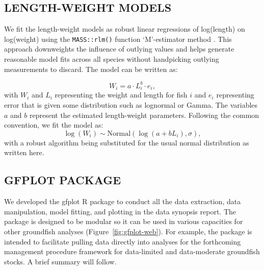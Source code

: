 \documentclass[11pt]{book}\usepackage[]{graphicx}\usepackage[]{color}
\begin{document}
\subsection{LENGTH-WEIGHT MODELS} \label{sec:length-weight-models}

We fit the length-weight models as robust linear regressions of log(length) on
log(weight) using the \texttt{MASS::rlm()} function `M'-estimator method
\citep{venables2002}. This approach downweights the influence of outlying values
and helps generate reasonable model fits across all species without handpicking
outlying measurements to discard. The model can be written as:

\begin{equation}
  W_i = a \cdot L_i^b \cdot e_i,
\end{equation}
with $W_i$ and $L_i$ representing the weight and length for fish $i$ and $e_i$
representing error that is given some distribution such as lognormal or Gamma.
The variables $a$ and $b$ represent the estimated length-weight parameters.
Following the common convention, we fit the model as:
\begin{equation}
  \log (W_i) \sim \mathrm{Normal} (\log (a + b L_i), \sigma),
\end{equation}
with a robust algorithm being substituted for the usual normal distribution as
written here.

\subsection{GFPLOT PACKAGE}

We developed the gfplot R package to conduct all the data extraction, data
manipulation, model fitting, and plotting in the data synopsis report. The
package is designed to be modular so it can be used in various capacities for
other groundfish analyses (Figure~\ref{fig:gfplot-web}). For example, the
package is intended to facilitate pulling data directly into analyses for the
forthcoming management procedure framework for data-limited and data-moderate
groundfish stocks. A brief summary will follow.
\end{document}
